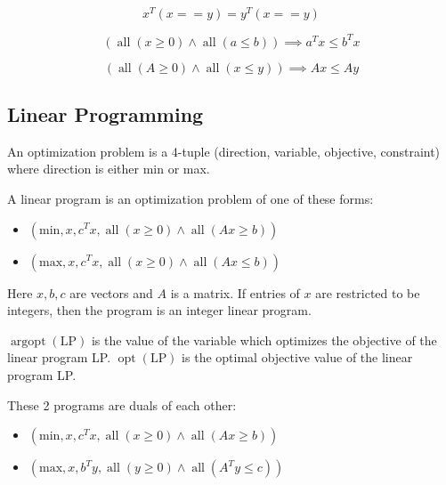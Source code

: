 \begin{theorem}[Exercise]\label{rel-vec-thm-2}
\[ x^T(x==y) = y^T(x==y) \]
\end{theorem}

\begin{theorem}[Exercise]\label{rel-vec-thm-3}
\[ (\operatorname{all}(x \ge 0) \wedge \operatorname{all}(a \le b)) \implies a^Tx \le b^Tx \]
\end{theorem}

\begin{corollary}[Exercise]\label{rel-vec-thm-4}
\[ (\operatorname{all}(A \ge 0) \wedge \operatorname{all}(x \le y)) \implies Ax \le Ay \]
\end{corollary}

\subsection{Linear Programming}

An optimization problem is a 4-tuple (direction, variable, objective, constraint)
where direction is either min or max.

A linear program is an optimization problem of one of these forms:
\begin{itemize}
\item $(\textrm{min}, x, c^Tx, \operatorname{all}(x \ge 0) \wedge \operatorname{all}(Ax \ge b))$
\item $(\textrm{max}, x, c^Tx, \operatorname{all}(x \ge 0) \wedge \operatorname{all}(Ax \le b))$
\end{itemize}
Here $x, b, c$ are vectors and $A$ is a matrix.
If entries of $x$ are restricted to be integers, then the program is an integer linear program.

$\operatorname{argopt}(\textrm{LP})$ is the value of the variable
which optimizes the objective of the linear program LP.
$\operatorname{opt}(\textrm{LP})$ is the optimal objective value of the linear program LP.

\begin{definition}
These 2 programs are duals of each other:
\begin{itemize}
\item $(\textrm{min}, x, c^Tx, \operatorname{all}(x \ge 0) \wedge \operatorname{all}(Ax \ge b))$
\item $(\textrm{max}, x, b^Ty, \operatorname{all}(y \ge 0) \wedge \operatorname{all}(A^Ty \le c))$
\end{itemize}
\end{definition}

